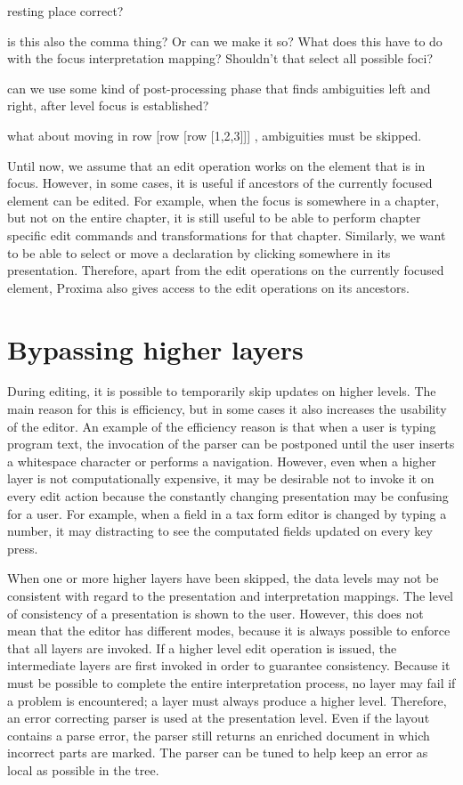 \bc
resting place correct?

is this also the comma thing? Or can we make it so?
What does this have to do with the focus interpretation mapping? Shouldn't that select all possible foci?

can we use some kind of post-processing phase that finds ambiguities left and right, after level focus is established?

what about moving in row [row [row [1,2,3]]] , ambiguities must be skipped. 
\ec

Until now, we assume that an edit operation works on the element that is in focus. However, in some cases, it is useful if ancestors of the currently focused element can be edited. For example, when the focus is somewhere in a chapter, but not on the entire chapter, it is still useful to be able to perform chapter specific edit commands and transformations for that chapter. Similarly, we want to be able to select or move a declaration by clicking somewhere in its presentation. Therefore, apart from the edit operations on the currently focused element, Proxima also gives access to the edit operations on its ancestors. 


%																
%																
%																
\section{Bypassing higher layers} \label{sect:bypassingLayers}

During editing, it is possible to temporarily skip updates on higher levels. The main reason for this is efficiency, but in some cases it also increases the usability of the editor. An example of the efficiency reason is that when a user is typing program text, the invocation of the parser can be postponed until the user inserts a whitespace character or performs a navigation. However, even when a higher layer is not computationally expensive, it may be desirable not to invoke it on every edit action because the constantly changing presentation may be confusing for a user. For example, when a field in a tax form editor is changed by typing a number, it may distracting to see the computated fields updated on every key press.

When one or more higher layers have been skipped, the data levels may not be consistent with regard to the presentation and interpretation mappings. The level of consistency of a presentation is shown to the user. However, this does not mean that the editor has different modes, because it is always possible to enforce that all layers are invoked. If a higher level edit operation is issued, the intermediate layers are first invoked in order to guarantee consistency. Because it must be possible to complete the entire interpretation process, no layer may fail if a problem is encountered; a layer must always produce a higher level. Therefore, an error correcting parser is used at the presentation level. Even if the layout contains a parse error, the parser still returns an enriched document in which incorrect parts are marked. The parser can be tuned to help keep an error as local as possible in the tree.

